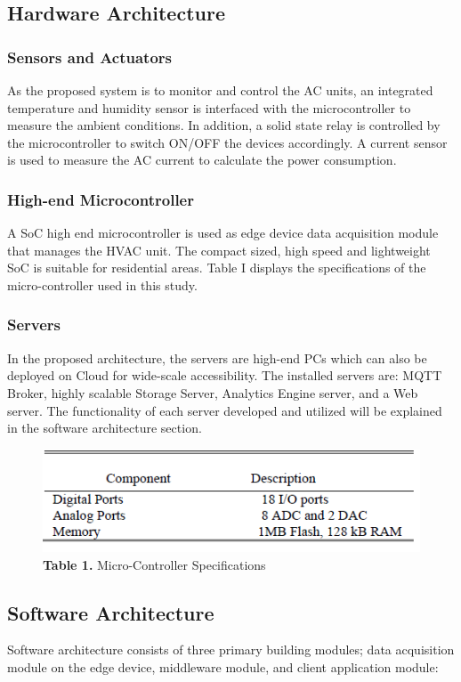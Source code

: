 \documentclass[a4paper,12pt,oneside]{article}
\let\counterwithin\relax
\begin{document}
\subsection{Hardware Architecture}
\subsubsection{Sensors and Actuators}
As the proposed system is to monitor and control the AC
units, an integrated temperature and humidity sensor is
interfaced with the microcontroller to measure the ambient
conditions. In addition, a solid state relay is controlled by the microcontroller
to switch ON/OFF the devices accordingly. A
current sensor is used to measure the AC current to calculate
the power consumption.
\subsubsection{High-end Microcontroller}
A SoC high end microcontroller is used as edge device data
acquisition module that manages the HVAC unit. The
compact sized, high speed and lightweight SoC is suitable for
residential areas. Table I displays the specifications of the
micro-controller used in this study.
\subsubsection{Servers}
In the proposed architecture, the servers are high-end PCs
which can also be deployed on Cloud for wide-scale
accessibility. The installed servers are: MQTT Broker, highly
scalable Storage Server, Analytics Engine server, and a Web
server. The functionality of each server developed and utilized
will be explained in the software architecture section.

\begin{figure}[H]
\includegraphics{Table1.png}
\centering
\caption{\textbf{Table 1.} Micro-Controller Specifications}
\end{figure}

\subsection{Software Architecture}
Software architecture consists of three primary building
modules; data acquisition module on the edge device,
middleware module, and client application module:
\end{document}
